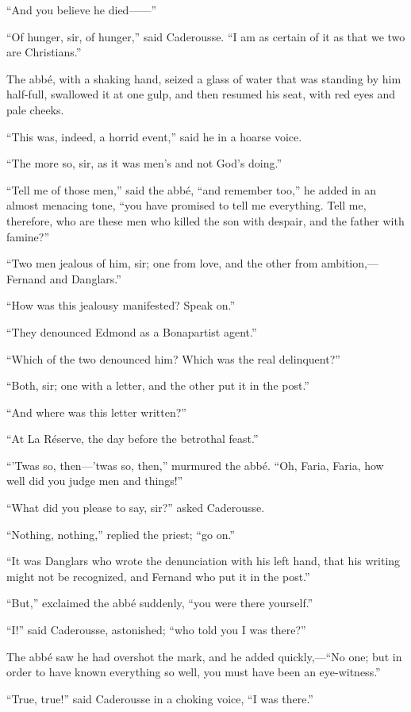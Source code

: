 “And you believe he died——”

“Of hunger, sir, of hunger,” said Caderousse. “I am as certain of it as
that we two are Christians.”

The abbé, with a shaking hand, seized a glass of water that was
standing by him half-full, swallowed it at one gulp, and then resumed
his seat, with red eyes and pale cheeks.

“This was, indeed, a horrid event,” said he in a hoarse voice.

“The more so, sir, as it was men’s and not God’s doing.”

“Tell me of those men,” said the abbé, “and remember too,” he added in
an almost menacing tone, “you have promised to tell me everything. Tell
me, therefore, who are these men who killed the son with despair, and
the father with famine?”

“Two men jealous of him, sir; one from love, and the other from
ambition,—Fernand and Danglars.”

“How was this jealousy manifested? Speak on.”

“They denounced Edmond as a Bonapartist agent.”

“Which of the two denounced him? Which was the real delinquent?”

“Both, sir; one with a letter, and the other put it in the post.”

“And where was this letter written?”

“At La Réserve, the day before the betrothal feast.”

“’Twas so, then—’twas so, then,” murmured the abbé. “Oh, Faria, Faria,
how well did you judge men and things!”

“What did you please to say, sir?” asked Caderousse.

“Nothing, nothing,” replied the priest; “go on.”

“It was Danglars who wrote the denunciation with his left hand, that
his writing might not be recognized, and Fernand who put it in the
post.”

“But,” exclaimed the abbé suddenly, “you were there yourself.”

“I!” said Caderousse, astonished; “who told you I was there?”

The abbé saw he had overshot the mark, and he added quickly,—“No one;
but in order to have known everything so well, you must have been an
eye-witness.”

“True, true!” said Caderousse in a choking voice, “I was there.”

